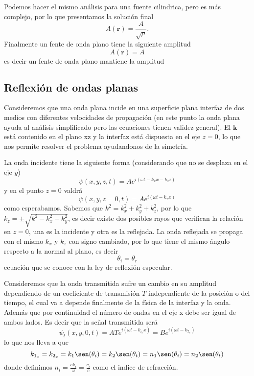 \documentclass[a4paper]{article}
\numberwithin{equation}{section}
\begin{document}
	Podemos hacer el mismo análisis para una fuente cilindrica, pero es más complejo, por lo que presentamos la solución final
	\begin{equation}
		A(\textbf{r}) = \frac{A}{\sqrt{\rho}}.
		\label{eq:ondas_ecuacion_general_amplitud_cilindrica}
	\end{equation}
	Finalmente un fente de onda plano tiene la siguiente amplitud
	\begin{equation}
		A(\textbf{r}) = A
		\label{eq:ondas_ecuacion_general_amplitud_plana}
	\end{equation}
	es decir un fente de onda plano mantiene la amplitud
	\subsection{Reflexión de ondas planas}
		Consideremos que una onda plana incide en una superficie plana interfaz de dos medios con diferentes velocidades de propagación (en este punto la onda plana ayuda al análisis simplificado pero las ecuaciones tienen validez general). El $\textbf{k}$ está contenido en el plano xz y la interfaz está dispuesta en el eje $z = 0$, lo que nos permite resolver el problema ayudandonos de la simetría.
		
		La onda incidente tiene la siguiente forma (considerando que no se desplaza en el eje $y$) \[ \psi(x,y,z,t) = A e^{i (\omega t - k_x x - k_z z)}\] y en el punto $z = 0$ valdrá \[\psi(x,y,z=0,t) = A e^{i(\omega t - k_x x)}\] como esperabamos. Sabemos que $k^2 = k_x^2 + k_y^2 + k_z^2$, por lo que $k_z = \pm \sqrt{k^2 - k_x^2 - k_y^2}$, es decir existe dos posibles rayos que verifican la relación en $z = 0$, una es la incidente y otra es la reflejada. La onda reflejada se propaga con el mismo $k_x$ y $k_z$ con signo cambiado, por lo que tiene el mismo ángulo respecto a la normal al plano, es decir
		\begin{equation}
			\theta_i = \theta_r
			\label{eq:ondas_reflexion_ley}
		\end{equation}
		ecuación que se conoce con la ley de reflexión especular.
		
		Consideremos que la onda transmitida sufre un cambio en su amplitud dependiendo de un coeficiente de transmisión $T$ independiente de la posición o del tiempo, el cual va a depende finalmente de la física de la interfaz y la onda. Además que por continuidad el número de ondas en el eje x debe ser igual de ambos lados. Es decir que la señal transmitida será \[ \psi_t(x,y,0,t) = A T e^{i (\omega t - k_{i_x} x)} = B e^{i(\omega t - k_{2_x})}\]
		lo que nos lleva a que 
		\begin{equation}
			k_{1_x} = k_{2_x} = k_1 \sen(\theta_i) = k_2 \sen(\theta_t) = n_1 \sen(\theta_i) = n_2 \sen(\theta_t)
			\label{eq:ondas_transmision_snell}
		\end{equation}
		donde definimos $n_i = \frac{c k_i}{\omega} = \frac{c_i}{c}$ como el indice de refracción.
\end{document}
